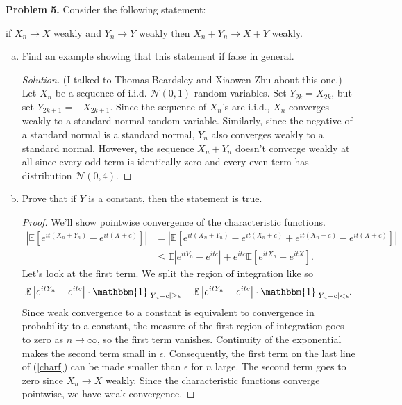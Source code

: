 \documentclass[11pt,letterpaper]{report}
\newcommand{\mcal}[1]{\mathcal{#1}}
\newcommand{\E}{\mathbb{E}}
\newcommand{\ind}{\mathbbm{1}}
\newenvironment{solution}
{\begin{proof}[Solution]}
{\end{proof}}
\begin{document}
\noindent\textbf{Problem 5. }
Consider the following statement:\\
\centerline{if $X_n\to X$ weakly and $Y_n\to Y$ weakly then $X_n+Y_n\to X+Y$ weakly.}
\begin{enumerate}[(a)]
	\item Find an example showing that this statement if false in general.
	\begin{solution}
		(I talked to Thomas Beardsley and Xiaowen Zhu about this one.) Let $X_n$ be a sequence of i.i.d. $\mcal{N}(0, 1)$ random variables. Set $Y_{2k} = X_{2k}$, but set $Y_{2k+1} = -X_{2k+1}$. Since the sequence of $X_n$'s are i.i.d., $X_n$ converges weakly to a standard normal random variable. Similarly, since the negative of a standard normal is a standard normal, $Y_n$ also converges weakly to a standard normal. However, the sequence $X_n + Y_n$ doesn't converge weakly at all since every odd term is identically zero and every even term has distribution $\mcal{N}(0, 4)$.
	\end{solution}

	\item Prove that if $Y$ is a constant, then the statement is true.
	\begin{proof}
		We'll show pointwise convergence of the characteristic functions.
		\begin{equation}\label{charf}
		\begin{split}
			\left|\E\left[e^{it(X_n+Y_n)} - e^{it(X+c)}\right]\right| &= \left|\E\left[e^{it(X_n+Y_n)} - e^{it(X_n+c)}+e^{it(X_n+c)}-e^{it(X+c)}\right]\right|\\
			& \leq \E\left|e^{itY_n} - e^{itc}\right| + e^{itc}\E\left[e^{itX_n} - e^{itX}\right].
		\end{split}
		\end{equation}
		Let's look at the first term. We split the region of integration like so
		\[
		\E\left|e^{itY_n} - e^{itc}\right| \cdot \ind_{|Y_n-c|\geq \epsilon} + \E\left|e^{itY_n} - e^{itc}\right| \cdot \ind_{|Y_n-c|< \epsilon}.
		\]
		Since weak convergence to a constant is equivalent to convergence in probability to a constant, the measure of the first region of integration goes to zero as $n\to \infty$, so the first term vanishes. Continuity of the exponential makes the second term small in $\epsilon$. Consequently, the first term on the last line of (\ref{charf}) can be made smaller than $\epsilon$ for $n$ large. The second term goes to zero since $X_n\to X$ weakly. Since the characteristic functions converge pointwise, we have weak convergence.
	\end{proof}


\end{enumerate}
\end{document}
